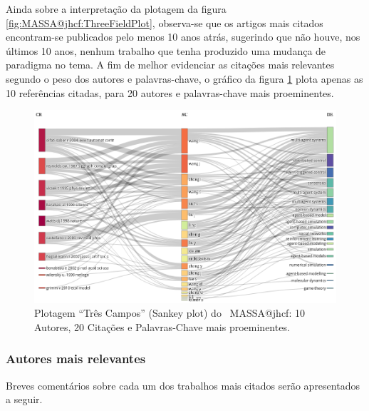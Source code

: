 Ainda sobre a interpretação da plotagem da figura \ref{fig:MASSA@jhcf:ThreeFieldPlot}, observa-se que os artigos mais citados encontram-se publicados pelo menos 10 anos atrás, sugerindo que não houve, nos últimos 10 anos, nenhum trabalho que tenha produzido uma mudança de paradigma no tema.
A fim de melhor evidenciar as citações mais relevantes segundo o peso dos autores e palavras-chave, o gráfico da figura \ref{fig:MASSA@jhcf:ThreeFieldPlot:10-20-20} plota apenas as 10 referências citadas, para 20 autores e palavras-chave mais proeminentes.

\begin{figure}
    \centering
    \includegraphics[angle=0,width=1\textwidth]{exploratory-data-analysis/jhcf/PesqBibliogr/SimulacaoMultiagente/WoS-20210803/classico-mais-citacoes/Dataset/ThreeFieldPlot-AU-CR-DE-20-10-20.png}
    \caption{Plotagem ``Três Campos'' (Sankey plot) do \dataset\   MASSA@jhcf: 10 Autores, 20 Citações e Palavras-Chave mais proeminentes.}
    \label{fig:MASSA@jhcf:ThreeFieldPlot:10-20-20}
\end{figure}

\subsubsection{Autores mais relevantes\label{MASSA:Sankey:AutoresRelevantes}}

Breves comentários sobre cada um dos trabalhos mais citados serão apresentados a seguir.

